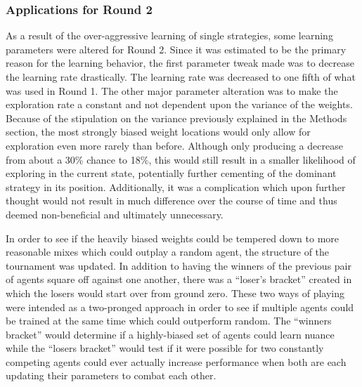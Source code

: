 




\subsubsection{Applications for Round 2}



As a result of the over-aggressive learning of single strategies,
some learning parameters were altered for Round 2.
%
Since it was estimated to be the primary reason for the learning behavior,
the first parameter tweak made was to decrease the learning rate drastically.
%
The learning rate was decreased to one fifth of what was used in Round 1.
%
The other major parameter alteration was to make the exploration rate a constant
and not dependent upon the variance of the weights.
%
Because of the stipulation on the variance previously explained in the Methods
section,
the most strongly biased weight locations would only allow for exploration
even more rarely than before.
%
Although only producing a decrease from about a 30\% chance to 18\%,
this would still result in a smaller likelihood of exploring in the current 
state,
potentially further cementing of the dominant strategy in its position.
%
Additionally,
it was a complication which upon further thought would not result in much
difference over the course of time
and thus deemed non-beneficial and ultimately unnecessary.


In order to see if the heavily biased weights could be tempered down to more
reasonable mixes which could outplay a random agent,
the structure of the tournament was updated.
%
In addition to having the winners of the previous pair of agents square
off against one another,
there was a ``loser's bracket'' created
in which the losers would start over from ground zero.
%
These two ways of playing were intended as a two-pronged approach
in order to see if multiple agents could be trained at the same time
which could outperform random.
%
The ``winners bracket'' would determine if a highly-biased set of agents could
learn nuance
while the ``losers bracket'' would test if it were possible for two constantly
competing agents could ever actually increase performance when both are each
updating their parameters to combat each other.

